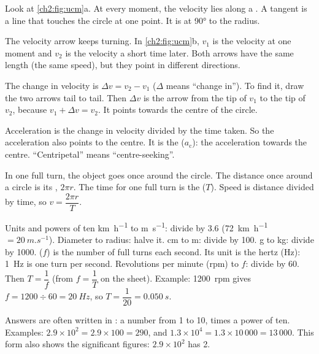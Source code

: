 Look at \cref{ch2:fig:ucm}a. At every moment, the velocity lies along a . A
tangent is a line that touches the circle at one point. It is at \ang{90} to the radius.

The velocity arrow keeps turning. In \cref{ch2:fig:ucm}b, $v_1$ is the velocity at one
moment and $v_2$ is the velocity a short time later. Both arrows have the same length (the
same speed), but they point in different directions.

The change in velocity is $\Delta v = v_2 - v_1$ ($\Delta$ means ``change in''). To find it,
draw the two arrows tail to tail. Then $\Delta v$ is the arrow from the tip of $v_1$ to the
tip of $v_2$, because $v_1 + \Delta v = v_2$. It points towards the centre of the circle.

Acceleration is the change in velocity divided by the time taken. So the acceleration also
points to the centre. It is the  ($a_\mathrm{c}$): the
acceleration towards the centre. ``Centripetal'' means ``centre-seeking''.

In one full turn, the object goes once around the circle. The distance once around a circle
is its , $2\pi r$. The time for one full turn is the  ($T$).
Speed is distance divided by time, so $v = \dfrac{2\pi r}{T}$.

\begin{toolkit}{Units and powers of ten}
\si{km.h^{-1}} to \si{m.s^{-1}}: divide by 3.6 (\qty{72}{km.h^{-1}} $= \qty{20}{m.s^{-1}}$).
Diameter to radius: halve it. \si{cm} to \si{m}: divide by 100. \si{g} to \si{kg}: divide by
1000.  ($f$) is the number of full turns each second. Its unit is the hertz
(\si{Hz}): \qty{1}{Hz} is one turn per second. Revolutions per minute (rpm) to $f$: divide
by 60. Then $T = \dfrac{1}{f}$ (from $f = \dfrac{1}{T}$ on the sheet). Example:
\qty{1200}{rpm} gives $f = 1200 \div 60 = \qty{20}{Hz}$, so $T = \dfrac{1}{20} = \qty{0.050}{s}$.

Answers are often written in : a number from 1 to 10, times a power
of ten. Examples: $2.9 \times 10^2 = 2.9 \times 100 = 290$, and
$1.3 \times 10^4 = 1.3 \times 10\,000 = 13\,000$. This form also shows the significant
figures: $2.9 \times 10^2$ has 2.
\end{toolkit}

